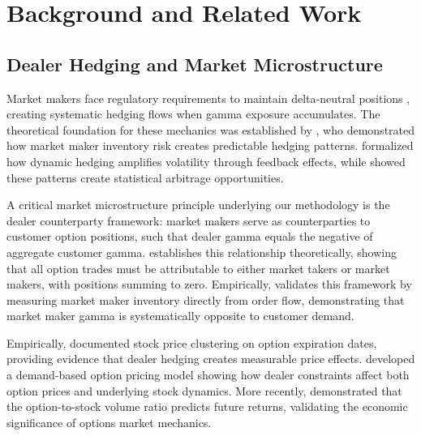 \section{Background and Related Work}

\subsection{Dealer Hedging and Market Microstructure}

Market makers face regulatory requirements to maintain delta-neutral positions \citep{sec15c31,finra4210}, creating systematic hedging flows when gamma exposure accumulates. The theoretical foundation for these mechanics was established by \citet{grossman1988liquidity}, who demonstrated how market maker inventory risk creates predictable hedging patterns. \citet{frey1997market} formalized how dynamic hedging amplifies volatility through feedback effects, while \citet{avellaneda2010statistical} showed these patterns create statistical arbitrage opportunities.

A critical market microstructure principle underlying our methodology is the dealer counterparty framework: market makers serve as counterparties to customer option positions, such that dealer gamma equals the negative of aggregate customer gamma. \citet{anderegg2022impact} establishes this relationship theoretically, showing that all option trades must be attributable to either market takers or market makers, with positions summing to zero. Empirically, \citet{dim2025zero} validates this framework by measuring market maker inventory directly from order flow, demonstrating that market maker gamma is systematically opposite to customer demand.

Empirically, \citet{ni2005stock} documented stock price clustering on option expiration dates, providing evidence that dealer hedging creates measurable price effects. \citet{garleanu2009demand} developed a demand-based option pricing model showing how dealer constraints affect both option prices and underlying stock dynamics. More recently, \citet{ge2016why} demonstrated that the option-to-stock volume ratio predicts future returns, validating the economic significance of options market mechanics.

